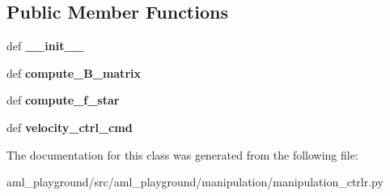 \subsection*{Public Member Functions}
\begin{DoxyCompactItemize}
\item 
\hypertarget{classaml__playground_1_1manipulation_1_1manipulation__ctrlr_1_1_man_cntrlr_a61c88fa7cc84bf36d3d1171bc2e81848}{def {\bfseries \-\_\-\-\_\-init\-\_\-\-\_\-}}\label{classaml__playground_1_1manipulation_1_1manipulation__ctrlr_1_1_man_cntrlr_a61c88fa7cc84bf36d3d1171bc2e81848}

\item 
\hypertarget{classaml__playground_1_1manipulation_1_1manipulation__ctrlr_1_1_man_cntrlr_ad98848b2fb1e94a534c5b8ed20d2e922}{def {\bfseries compute\-\_\-\-B\-\_\-matrix}}\label{classaml__playground_1_1manipulation_1_1manipulation__ctrlr_1_1_man_cntrlr_ad98848b2fb1e94a534c5b8ed20d2e922}

\item 
\hypertarget{classaml__playground_1_1manipulation_1_1manipulation__ctrlr_1_1_man_cntrlr_a235c471e48870d0c30a7dec2d672c340}{def {\bfseries compute\-\_\-f\-\_\-star}}\label{classaml__playground_1_1manipulation_1_1manipulation__ctrlr_1_1_man_cntrlr_a235c471e48870d0c30a7dec2d672c340}

\item 
\hypertarget{classaml__playground_1_1manipulation_1_1manipulation__ctrlr_1_1_man_cntrlr_a8c425b1447b492aa8140a5c30d10f0a3}{def {\bfseries velocity\-\_\-ctrl\-\_\-cmd}}\label{classaml__playground_1_1manipulation_1_1manipulation__ctrlr_1_1_man_cntrlr_a8c425b1447b492aa8140a5c30d10f0a3}

\end{DoxyCompactItemize}


The documentation for this class was generated from the following file\-:\begin{DoxyCompactItemize}
\item 
aml\-\_\-playground/src/aml\-\_\-playground/manipulation/manipulation\-\_\-ctrlr.\-py\end{DoxyCompactItemize}
